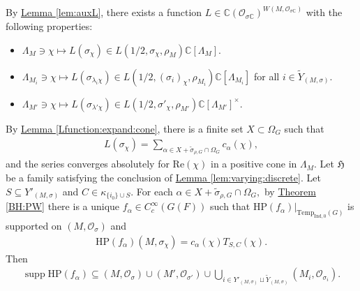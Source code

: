 \documentclass[10pt]{amsart}
\theoremstyle{definition}
\numberwithin{equation}{section}
\DeclareMathOperator{\supp}{\mathrm{supp}}
\numberwithin{equation}{subsection}
\newcommand{\CC}{\mathbb{C}}
\begin{document}
By \hyperref[lem:auxL]{Lemma \ref{lem:auxL}}, there exists a function $L\in \CC(\mathcal{O}_{\sigma\CC})^{W(M,\mathcal{O}_{\sigma\CC})}$ with the following properties:
\begin{itemize}
    \item $\Lambda_M\ni \chi \mapsto L(\sigma_\chi)\in L(1/2,\sigma_\chi,\rho_M)\CC[\Lambda_M].$
    \item $\Lambda_{M_i}\ni \chi \mapsto  L(\sigma_{\lambda_i\chi})\in L(1/2,(\sigma_i)_\chi,\rho_{M_i})\CC[\Lambda_{M_i}]$ for all $i\in \widetilde{Y}_{(M,\sigma)}.$
    \item $\Lambda_{M'}\ni \chi \mapsto L(\sigma_{\lambda'\chi})\in L(1/2,\sigma'_\chi,\rho_{M'})\CC[\Lambda_{M'}]^\times$.
\end{itemize}
By \hyperref[Lfunction:expand:cone]{Lemma \ref{Lfunction:expand:cone}}, there is a finite set $X\subset \Omega_G$ such that
\begin{align*}
       L(\sigma_\chi) = \sum_{\alpha\in X + \widetilde{\sigma}_{\rho,G}\cap \Omega_G} c_\alpha(\chi),
\end{align*}
and the series converges absolutely for $\mathrm{Re}(\chi)$ in a positive cone in $\Lambda_{M}.$ Let $\mathfrak{H}$ be a family satisfying the conclusion of \hyperref[lem:varying:discrete]{Lemma \ref{lem:varying:discrete}}. Let $S\subseteq Y'_{(M,
\sigma)}$ and $C\in \kappa_{\{i_0\}\cup S}.$ For each $\alpha\in X+ \widetilde{\sigma}_{\rho,G}\cap \Omega_G,$ by \hyperref[BH:PW]{Theorem \ref{BH:PW}} there is a unique $f_\alpha\in C^\infty_c(G(F))$ such that $\mathrm{HP}(f_\alpha)|_{\mathrm{Temp}_{\mathrm{Ind},0}(G)}$ is supported on $(M,\mathcal{O}_\sigma)$ and
\begin{align*}
    \mathrm{HP}(f_\alpha)(M,\sigma_{\chi})=c_\alpha(\chi)T_{S,C}(\chi).
\end{align*}
Then 
\begin{align*}
    \supp \mathrm{HP}(f_\alpha)\subseteq (M,\mathcal{O}_{\sigma})\cup (M',\mathcal{O}_{\sigma'})\cup \bigcup_{i\in  Y'_{(M,\sigma)}\sqcup\widetilde{Y}_{(M,\sigma)}} (M_i,\mathcal{O}_{\sigma_i}).
\end{align*}
\end{document}
